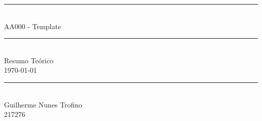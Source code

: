 \documentclass{article}
\begin{document}
    \begin{titlepage}
        \begin{center}
            \rule{450pt}{0.5pt}\\[4mm]
            {\Huge AA000 - Template}\\
            \rule{450pt}{0.5pt}\\[2mm]
            {\Large Resumo Teórico}\\[200mm]
            \today\\
            \rule{250pt}{0.5pt}\\
            {\large Guilherme Nunes Trofino}\\
            {\large 217276}\\
        \end{center}
    \end{titlepage}
\newpage

    \tableofcontents
\newpage
\end{document}
